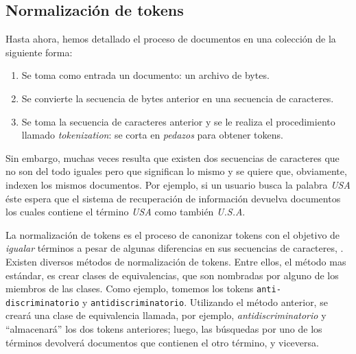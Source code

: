 	\subsection{Normalización de tokens}
		Hasta ahora, hemos detallado el proceso de documentos en una colección de la siguiente forma:
		\begin{enumerate}
			\item Se toma como entrada un documento: un archivo de bytes.
			\item Se convierte la secuencia de bytes anterior en una secuencia de caracteres.
			\item Se toma la secuencia de caracteres anterior y se le realiza el procedimiento llamado \textit{tokenization}: se corta en \textit{pedazos} para obtener tokens.
		\end{enumerate}
		Sin embargo, muchas veces resulta que existen dos secuencias de caracteres que no son del todo iguales pero que significan lo mismo y se quiere que, obviamente, indexen los mismos documentos. Por ejemplo, si un usuario busca la palabra \textit{USA} éste espera que el sistema de recuperación de información devuelva documentos los cuales contiene el término \textit{USA} como también \textit{U.S.A}. \par
		
		La normalización de tokens es el proceso de canonizar tokens con el objetivo de \textit{igualar} términos a pesar de algunas diferencias en sus secuencias de caracteres, \cite{manning2009}. Existen diversos métodos de normalización de tokens. Entre ellos, el método  mas estándar, es crear clases de equivalencias, que son nombradas por alguno de los miembros de las clases. Como ejemplo, tomemos los tokens \texttt{anti-discriminatorio} y \texttt{antidiscriminatorio}. Utilizando el método anterior, se creará una clase de equivalencia llamada, por ejemplo, \textit{antidiscriminatorio} y \enquote{almacenará} los dos tokens anteriores; luego, las búsquedas por uno de los términos devolverá documentos que contienen el otro término, y viceversa. \par
		
